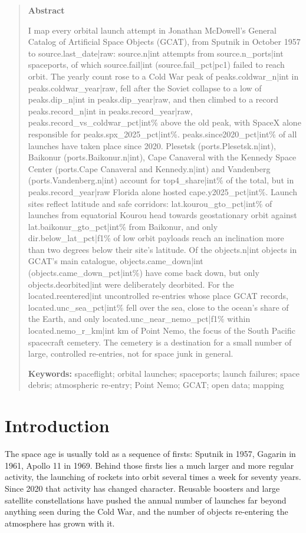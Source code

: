 \documentclass[11pt,a4paper]{article}
\begin{document}
\begin{quote}
\small
\begin{center}\textbf{Abstract}\end{center}
I map every orbital launch attempt in Jonathan McDowell's General Catalog of Artificial Space Objects (GCAT), from Sputnik in October 1957 to {{source.last_date|raw}}: {{source.n|int}} attempts from {{source.n_ports|int}} spaceports, of which {{source.fail|int}} ({{source.fail_pct|pc1}}) failed to reach orbit. The yearly count rose to a Cold War peak of {{peaks.coldwar_n|int}} in {{peaks.coldwar_year|raw}}, fell after the Soviet collapse to a low of {{peaks.dip_n|int}} in {{peaks.dip_year|raw}}, and then climbed to a record {{peaks.record_n|int}} in {{peaks.record_year|raw}}, {{peaks.record_vs_coldwar_pct|int}}\% above the old peak, with SpaceX alone responsible for {{peaks.spx_2025_pct|int}}\%. {{peaks.since2020_pct|int}}\% of all launches have taken place since 2020. Plesetsk ({{ports.Plesetsk.n|int}}), Baikonur ({{ports.Baikonur.n|int}}), Cape Canaveral with the Kennedy Space Center ({{ports.Cape Canaveral and Kennedy.n|int}}) and Vandenberg ({{ports.Vandenberg.n|int}}) account for {{top4_share|int}}\% of the total, but in {{peaks.record_year|raw}} Florida alone hosted {{cape.y2025_pct|int}}\%. Launch sites reflect latitude and safe corridors: {{lat.kourou_gto_pct|int}}\% of launches from equatorial Kourou head towards geostationary orbit against {{lat.baikonur_gto_pct|int}}\% from Baikonur, and only {{dir.below_lat_pct|f1}}\% of low orbit payloads reach an inclination more than two degrees below their site's latitude. Of the {{objects.n|int}} objects in GCAT's main catalogue, {{objects.came_down|int}} ({{objects.came_down_pct|int}}\%) have come back down, but only {{objects.deorbited|int}} were deliberately deorbited. For the {{located.reentered|int}} uncontrolled re-entries whose place GCAT records, {{located.unc_sea_pct|int}}\% fell over the sea, close to the ocean's share of the Earth, and only {{located.unc_near_nemo_pct|f1}}\% within {{located.nemo_r_km|int}} km of Point Nemo, the focus of the South Pacific spacecraft cemetery. The cemetery is a destination for a small number of large, controlled re-entries, not for space junk in general.

\textbf{Keywords:} spaceflight; orbital launches; spaceports; launch failures; space debris; atmospheric re-entry; Point Nemo; GCAT; open data; mapping
\end{quote}

\section{Introduction}
The space age is usually told as a sequence of firsts: Sputnik in 1957, Gagarin in 1961, Apollo 11 in 1969. Behind those firsts lies a much larger and more regular activity, the launching of rockets into orbit several times a week for seventy years. Since 2020 that activity has changed character. Reusable boosters and large satellite constellations have pushed the annual number of launches far beyond anything seen during the Cold War, and the number of objects re-entering the atmosphere has grown with it.
\end{document}
